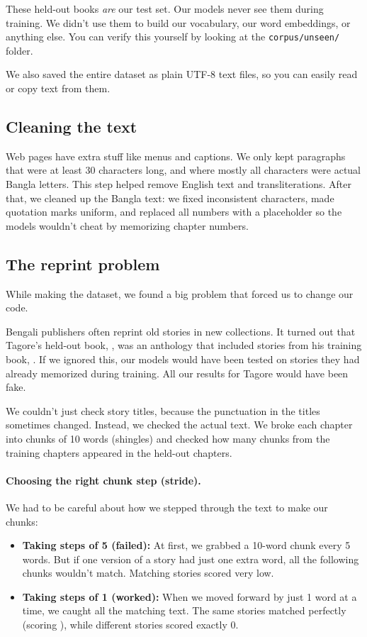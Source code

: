These \nUnseenBooks{} held-out books \emph{are} our test set. Our models never see them during training. We didn't use them to build our vocabulary, our word embeddings, or anything else. You can verify this yourself by looking at the \texttt{corpus/unseen/} folder.

We also saved the entire dataset as plain UTF-8 text files, so you can easily read or copy text from them.

\subsection{Cleaning the text}

Web pages have extra stuff like menus and captions. We only kept paragraphs that were at least 30 characters long, and where mostly all characters were actual Bangla letters. This step helped remove English text and transliterations. After that, we cleaned up the Bangla text: we fixed inconsistent characters, made quotation marks uniform, and replaced all numbers with a placeholder so the models wouldn't cheat by memorizing chapter numbers.

\subsection{The reprint problem}
\label{sec:overlap}

While making the dataset, we found a big problem that forced us to change our code.

Bengali publishers often reprint old stories in new collections. It turned out that Tagore's held-out book, \bn{\overlapUnseenBook{}}, was an anthology that included stories from his training book, \bn{\overlapTrainBook{}}. If we ignored this, our models would have been tested on stories they had already memorized during training. All our results for Tagore would have been fake.

We couldn't just check story titles, because the punctuation in the titles sometimes changed. Instead, we checked the actual text. We broke each chapter into chunks of 10 words (shingles) and checked how many chunks from the training chapters appeared in the held-out chapters.

\paragraph{Choosing the right chunk step (stride).}
We had to be careful about how we stepped through the text to make our chunks:
\begin{itemize}
  \item \textbf{Taking steps of 5 (failed):} At first, we grabbed a 10-word chunk every 5 words. But if one version of a story had just one extra word, all the following chunks wouldn't match. Matching stories scored very low.
  \item \textbf{Taking steps of 1 (worked):} When we moved forward by just 1 word at a time, we caught all the matching text. The same stories matched perfectly (scoring \overlapRange{}), while different stories scored exactly 0.
\end{itemize}

